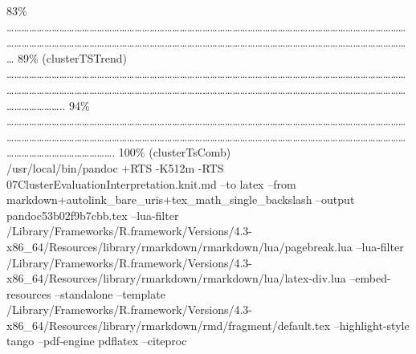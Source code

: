 \documentclass[
]{article}
\begin{document}
\textbar{} 83\% \textbar{}
\textbar\ldots\ldots\ldots\ldots\ldots\ldots\ldots\ldots\ldots\ldots\ldots\ldots\ldots\ldots\ldots\ldots\ldots\ldots\ldots\ldots\ldots\ldots\ldots\ldots\ldots\ldots\ldots\ldots\ldots\ldots\ldots\ldots\ldots\ldots\ldots\ldots\ldots\ldots\ldots\ldots\ldots\ldots\ldots\ldots\ldots\ldots\ldots\ldots\ldots\ldots\ldots\ldots\ldots\ldots\ldots\ldots\ldots\ldots\ldots\ldots\ldots\ldots\ldots\ldots\ldots\ldots\ldots\ldots\ldots\ldots\ldots\ldots\ldots\ldots\ldots\ldots\ldots\ldots\ldots\ldots\ldots\ldots\ldots\ldots\ldots\ldots\ldots\ldots\ldots\ldots\ldots\ldots\ldots\ldots\ldots\ldots\ldots\ldots\ldots\ldots\ldots\ldots\ldots\ldots\ldots\ldots\ldots{}
\textbar{} 89\% (clusterTSTrend) \textbar{}
\textbar\ldots\ldots\ldots\ldots\ldots\ldots\ldots\ldots\ldots\ldots\ldots\ldots\ldots\ldots\ldots\ldots\ldots\ldots\ldots\ldots\ldots\ldots\ldots\ldots\ldots\ldots\ldots\ldots\ldots\ldots\ldots\ldots\ldots\ldots\ldots\ldots\ldots\ldots\ldots\ldots\ldots\ldots\ldots\ldots\ldots\ldots\ldots\ldots\ldots\ldots\ldots\ldots\ldots\ldots\ldots\ldots\ldots\ldots\ldots\ldots\ldots\ldots\ldots\ldots\ldots\ldots\ldots\ldots\ldots\ldots\ldots\ldots\ldots\ldots\ldots\ldots\ldots\ldots\ldots\ldots\ldots\ldots\ldots\ldots\ldots\ldots\ldots\ldots\ldots\ldots\ldots\ldots\ldots\ldots\ldots\ldots\ldots\ldots\ldots\ldots\ldots\ldots\ldots\ldots\ldots\ldots\ldots\ldots\ldots\ldots\ldots\ldots\ldots..
\textbar{} 94\% \textbar{}
\textbar\ldots\ldots\ldots\ldots\ldots\ldots\ldots\ldots\ldots\ldots\ldots\ldots\ldots\ldots\ldots\ldots\ldots\ldots\ldots\ldots\ldots\ldots\ldots\ldots\ldots\ldots\ldots\ldots\ldots\ldots\ldots\ldots\ldots\ldots\ldots\ldots\ldots\ldots\ldots\ldots\ldots\ldots\ldots\ldots\ldots\ldots\ldots\ldots\ldots\ldots\ldots\ldots\ldots\ldots\ldots\ldots\ldots\ldots\ldots\ldots\ldots\ldots\ldots\ldots\ldots\ldots\ldots\ldots\ldots\ldots\ldots\ldots\ldots\ldots\ldots\ldots\ldots\ldots\ldots\ldots\ldots\ldots\ldots\ldots\ldots\ldots\ldots\ldots\ldots\ldots\ldots\ldots\ldots\ldots\ldots\ldots\ldots\ldots\ldots\ldots\ldots\ldots\ldots\ldots\ldots\ldots\ldots\ldots\ldots\ldots\ldots\ldots\ldots\ldots\ldots\ldots\ldots\ldots\ldots\ldots.\textbar{}
100\% (clusterTsComb)\\
/usr/local/bin/pandoc +RTS -K512m -RTS
07ClusterEvaluationInterpretation.knit.md --to latex --from
markdown+autolink\_bare\_uris+tex\_math\_single\_backslash --output
pandoc53b02f9b7cbb.tex --lua-filter
/Library/Frameworks/R.framework/Versions/4.3-x86\_64/Resources/library/rmarkdown/rmarkdown/lua/pagebreak.lua
--lua-filter
/Library/Frameworks/R.framework/Versions/4.3-x86\_64/Resources/library/rmarkdown/rmarkdown/lua/latex-div.lua
--embed-resources --standalone --template
/Library/Frameworks/R.framework/Versions/4.3-x86\_64/Resources/library/rmarkdown/rmd/fragment/default.tex
--highlight-style tango --pdf-engine pdflatex --citeproc
\end{document}
